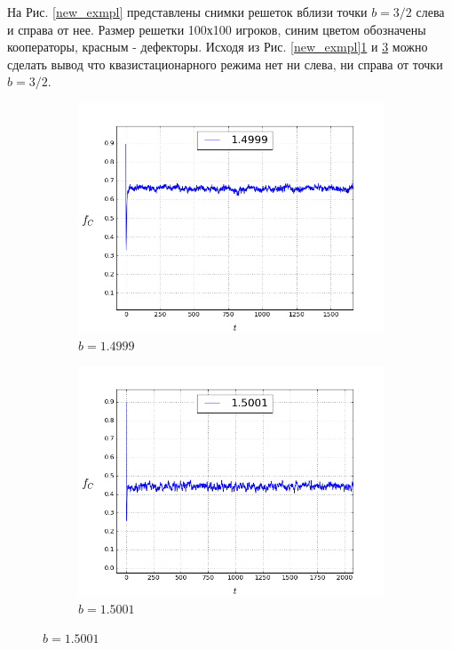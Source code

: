 \documentclass[a4paper]{article}
\begin{document}
	
	\par На Рис. \ref{new_exmpl} представлены снимки решеток вблизи точки $b=3/2$ слева и справа от нее. Размер решетки 100х100 игроков, синим цветом обозначены кооператоры, красным - дефекторы. Исходя из Рис. \ref{new_exmpl}\ref{newf_left} и \ref{newf_right} можно сделать вывод что квазистационарного режима нет ни слева, ни справа от точки $b=3/2$.
	\begin{figure}[H]
		\centering
		\begin{subfigure}{.5\textwidth}
			\includegraphics[width=1\linewidth]{f1.4999.png}
			\caption{$b=1.4999$}
			\label{newf_left}
		\end{subfigure}%
		\begin{subfigure}{.5\textwidth}
			\includegraphics[width=1\linewidth]{f1.5001.png}
			\caption{$b=1.5001$}
			\label{newf_right}			
		\end{subfigure}%
	

\end{figure}
\end{document}
